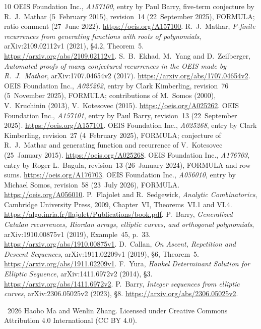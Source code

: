 \documentclass[11pt]{article}
\begin{document}
\begin{thebibliography}{10}
\small
{}
OEIS Foundation Inc., \emph{A157100}, entry by Paul Barry,
five-term conjecture by R.~J.~Mathar (5~February 2015), revision~14
(22~September 2025), FORMULA; ratio comment (27~June 2022).
\url{https://oeis.org/A157100}.
R.~J.~Mathar, \emph{P-finite recurrences from generating functions with
roots of polynomials}, arXiv:2109.02112v1 (2021), \S4.2, Theorem~5.
\url{https://arxiv.org/abs/2109.02112v1}.
S.~B.~Ekhad, M.~Yang and D.~Zeilberger,
\emph{Automated proofs of many conjectured recurrences in the OEIS
made by R.~J.~Mathar}, arXiv:1707.04654v2 (2017).
\url{https://arxiv.org/abs/1707.04654v2}.
OEIS Foundation Inc., \emph{A025262}, entry by Clark Kimberling,
revision~76 (5~November 2025), FORMULA; contributions of M.~Somos
(2000), V.~Kruchinin (2013), V.~Kotesovec (2015).
\url{https://oeis.org/A025262}.
OEIS Foundation Inc., \emph{A157101}, entry by Paul Barry,
revision~13 (22~September 2025).
\url{https://oeis.org/A157101}.
OEIS Foundation Inc., \emph{A025268}, entry by Clark Kimberling,
revision~27 (4~February 2025), FORMULA; conjecture of R.~J.~Mathar
and generating function and recurrence of V.~Kotesovec (25~January 2015).
\url{https://oeis.org/A025268}.
OEIS Foundation Inc., \emph{A176703}, entry by Roger L.~Bagula,
revision~13 (26~January 2024), FORMULA and row sums.
\url{https://oeis.org/A176703}.
OEIS Foundation Inc., \emph{A056010}, entry by Michael Somos,
revision~58 (23~July 2026), FORMULA.
\url{https://oeis.org/A056010}.
P.~Flajolet and R.~Sedgewick, \emph{Analytic Combinatorics},
Cambridge University Press, 2009, Chapter~VI,
Theorems~VI.1 and VI.4.
\url{https://algo.inria.fr/flajolet/Publications/book.pdf}.
P.~Barry, \emph{Generalized Catalan recurrences, Riordan arrays,
elliptic curves, and orthogonal polynomials}, arXiv:1910.00875v1
(2019), Example~45, p.~33.
\url{https://arxiv.org/abs/1910.00875v1}.
D.~Callan, \emph{On Ascent, Repetition and Descent Sequences},
arXiv:1911.02209v1 (2019), \S6, Theorem~5.
\url{https://arxiv.org/abs/1911.02209v1}.
F.~Yura, \emph{Hankel Determinant Solution for Elliptic Sequence},
arXiv:1411.6972v2 (2014), \S3.
\url{https://arxiv.org/abs/1411.6972v2}.
P.~Barry, \emph{Integer sequences from elliptic curves},
arXiv:2306.05025v2 (2023), \S8.
\url{https://arxiv.org/abs/2306.05025v2}.
\end{thebibliography}

\noindent\small\textcopyright\ 2026 Haobo Ma and Wenlin Zhang.
Licensed under Creative Commons Attribution 4.0 International
(CC BY 4.0).
\end{document}
